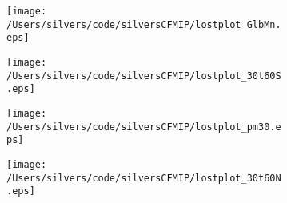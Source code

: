 \documentclass[varwidth, border=10pt]{standalone}
\begin{document}
\begin{figure}
  \centering
  \begin{subfigure}{0.24\textwidth}
  \texttt{[image: /Users/silvers/code/silversCFMIP/lostplot\_GlbMn.eps]}
\end{subfigure}
\begin{subfigure}{0.24\textwidth}
  \texttt{[image: /Users/silvers/code/silversCFMIP/lostplot\_30t60S.eps]}
\end{subfigure}
\begin{subfigure}{0.24\textwidth}
  \texttt{[image: /Users/silvers/code/silversCFMIP/lostplot\_pm30.eps]}
\end{subfigure}
\begin{subfigure}{0.24\textwidth}
  \texttt{[image: /Users/silvers/code/silversCFMIP/lostplot\_30t60N.eps]}
\end{subfigure}
\end{figure}
\end{document}
